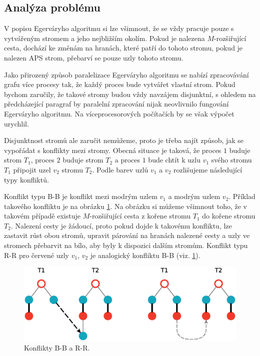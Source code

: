 \documentclass[a4paper, 11pt, titlepage, final]{article}[3. prosinec 2011]
\begin{document}
\subsection{Analýza problému}

V popisu Egerváryho algoritmu si lze všimnout, že se vždy pracuje pouze s vytvářeným stromem a jeho nejbližším okolím. Pokud je nalezena $M$-rozšiřující cesta, dochází ke změnám na hranách, které patří do tohoto stromu, pokud je nalezen APS strom, přebarví se pouze uzly tohoto stromu.

Jako přirozený způsob paralelizace Egerváryho algoritmu se nabízí zpracovávání grafu více procesy tak, že každý proces bude vytvářet vlastní strom. Pokud bychom zaručily, že takové stromy budou vždy navzájem disjunktní, s ohledem na předcházející paragraf by paralelní zpracování nijak neovlivnilo fungování Egerváryho algoritmu. Na víceprocesorových počítačích by se však výpočet urychlil.

Disjunktnost stromů ale zaručit nemůžeme, proto je třeba najít způsob, jak se vypořádat s konflikty mezi stromy. Obecná situace je taková, že proces $1$ buduje strom $T_1$, proces $2$ buduje strom $T_2$ a proces $1$ bude chtít k uzlu $v_1$ svého stromu $T_1$ připojit uzel $v_2$ stromu $T_2$. Podle barev uzlů $v_1$ a $v_2$ rozlišujeme následující typy konfliktů.

Konflikt typu B-B je konflikt mezi modrým uzlem $v_1$ a modrým uzlem $v_2$. Příklad takového konfliktu je na obrázku \ref{imgXX}. Na obrázku si můžeme všimnout toho, že v takovém případě existuje $M$-rozšiřující cesta z kořene stromu $T_1$ do kořene stromu $T_2$. Nalezení cesty je žádoucí, proto pokud dojde k takovému konfliktu, lze zastavit růst obou stromů, upravit párování na hranách nalezené cesty a uzly ve stromech přebarvit na bílo, aby byly k dispozici dalším stromům. Konflikt typu R-R pro červené uzly $v_1$, $v_2$ je analogický konfliktu B-B (viz. \ref{imgXX}).

\begin{figure}[ht]
  \centering
  \includegraphics[scale=0.5]{img/XXconflicts.eps}
  \caption{Konflikty B-B a R-R.}
  \label{imgXX}
\end{figure}
\end{document}
